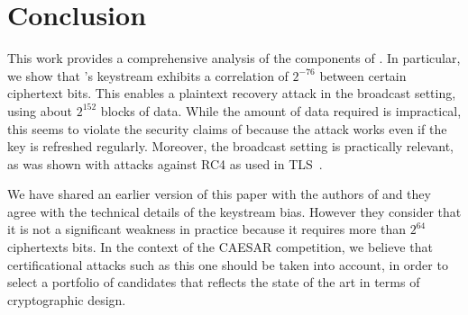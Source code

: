 
\section{Conclusion}
\label{sec/Conclusion}

This work provides a comprehensive analysis of the components of
\MORUS.  In particular, we show that \MORUS[1280]'s keystream exhibits a correlation of $2^{-76}$ between certain ciphertext bits. This enables a plaintext recovery
attack in the broadcast setting, using about $2^{152}$ blocks of data.
While the amount of data required is impractical, this seems to
violate the security claims of \MORUS[1280] because the attack works
even if the key is refreshed regularly.  Moreover, the broadcast
setting is practically relevant, as was shown with attacks against RC4
as used in TLS~\cite{DBLP:conf/uss/AlFardanBPPS13}.

We have shared an earlier version of this paper with the authors of
\MORUS and they agree with the technical details of the keystream
bias.  However they consider that it is not a significant weakness in
practice because it requires more than $2^{64}$ ciphertexts bits.  In
the context of the CAESAR competition, we believe that certificational
attacks such as this one should be taken into account, in order to
select a portfolio of candidates that reflects the state of the art in
terms of cryptographic design.


